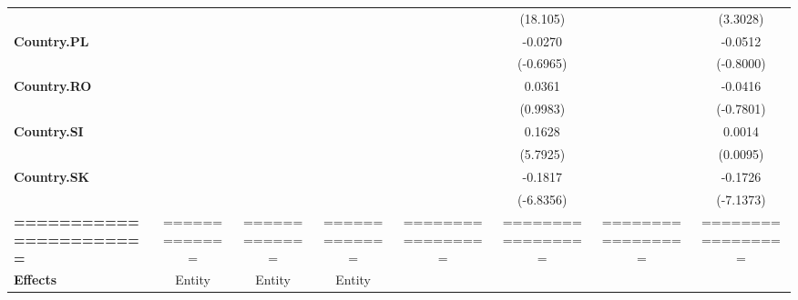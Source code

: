\documentclass{article}
\begin{document}
\begin{table}[!htbp]
\begin{center}
{\begin{tabular}{lccccccc}
\textbf{ }                       &                              &                                &                  &                   &       (18.105)       &                   &      (3.3028)      \\
\textbf{Country.PL}              &                              &                                &                  &                   &       -0.0270        &                   &      -0.0512       \\
\textbf{ }                       &                              &                                &                  &                   &      (-0.6965)       &                   &     (-0.8000)      \\
\textbf{Country.RO}              &                              &                                &                  &                   &        0.0361        &                   &      -0.0416       \\
\textbf{ }                       &                              &                                &                  &                   &       (0.9983)       &                   &     (-0.7801)      \\
\textbf{Country.SI}              &                              &                                &                  &                   &        0.1628        &                   &       0.0014       \\
\textbf{ }                       &                              &                                &                  &                   &       (5.7925)       &                   &      (0.0095)      \\
\textbf{Country.SK}              &                              &                                &                  &                   &       -0.1817        &                   &      -0.1726       \\
\textbf{ }                       &                              &                                &                  &                   &      (-6.8356)       &                   &     (-7.1373)      \\
\textbf{=======================} &        =============         &         =============          &  =============   & ================= &  =================   & ================= & =================  \\
\textbf{Effects}                 &            Entity            &             Entity             &      Entity      &                   &                      &                   &                    \\
\bottomrule
\end{tabular}

}
\end{center}
\end{table}
\end{document}
